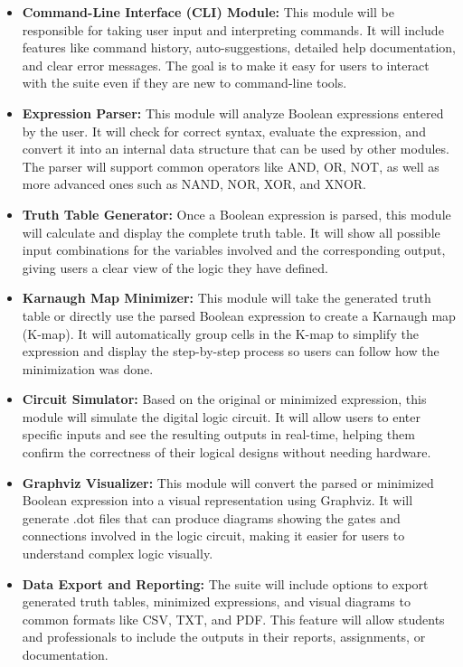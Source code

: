 \begin{itemize}
    \item \textbf{Command-Line Interface (CLI) Module:} This module will be responsible for taking user input and interpreting commands. It will include features like command history, auto-suggestions, detailed help documentation, and clear error messages. The goal is to make it easy for users to interact with the suite even if they are new to command-line tools.

    \item \textbf{Expression Parser:} This module will analyze Boolean expressions entered by the user. It will check for correct syntax, evaluate the expression, and convert it into an internal data structure that can be used by other modules. The parser will support common operators like AND, OR, NOT, as well as more advanced ones such as NAND, NOR, XOR, and XNOR.

    \item \textbf{Truth Table Generator:} Once a Boolean expression is parsed, this module will calculate and display the complete truth table. It will show all possible input combinations for the variables involved and the corresponding output, giving users a clear view of the logic they have defined.

    \item \textbf{Karnaugh Map Minimizer:} This module will take the generated truth table or directly use the parsed Boolean expression to create a Karnaugh map (K-map). It will automatically group cells in the K-map to simplify the expression and display the step-by-step process so users can follow how the minimization was done.

    \item \textbf{Circuit Simulator:} Based on the original or minimized expression, this module will simulate the digital logic circuit. It will allow users to enter specific inputs and see the resulting outputs in real-time, helping them confirm the correctness of their logical designs without needing hardware.

    \item \textbf{Graphviz Visualizer:} This module will convert the parsed or minimized Boolean expression into a visual representation using Graphviz. It will generate .dot files that can produce diagrams showing the gates and connections involved in the logic circuit, making it easier for users to understand complex logic visually.

    \item \textbf{Data Export and Reporting:} The suite will include options to export generated truth tables, minimized expressions, and visual diagrams to common formats like CSV, TXT, and PDF. This feature will allow students and professionals to include the outputs in their reports, assignments, or documentation.
\end{itemize}


